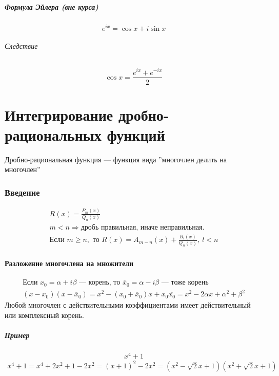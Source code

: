 \documentclass{article}
\begin{document}
\subsubsection{Формула Эйлера (вне курса)}
\[
    e^{ix} = \cos x + i\sin x
\]
\paragraph{Следствие}
\[
    \cos x = \frac{e^{ix} + e^{-ix}}{2}
\]




\newpage
\part{Интегрирование дробно-рациональных функций}
Дробно-рациональная функция --- функция вида ''многочлен делить на многочлен''

\section{Введение}
\begin{gather*}
    R(x) = \frac{P_m(x)}{Q_n(x)} \\
    m < n \Rightarrow \text{дробь правильная, иначе неправильная}. \\
    \text{Если } m \ge n, \text{ то } R(x) = A_{m-n}(x) + \frac{B_l(x)}{Q_n(x)}, ~l < n
\end{gather*}


\subsection{Разложение многочлена на множители}
\begin{gather*}
    \text{Если } x_0 = \alpha + i \beta \text{ --- корень, то } \overline{x}_0 = \alpha - i\beta \text{ --- тоже корень} \\
    (x - x_0)(x - \overline{x}_0) = x^2 - (x_0 + \overline{x}_0)x + x_0\overline{x_0} = x^2 - 2\alpha x + \alpha^2 + \beta^2
\end{gather*}
Любой многочлен с действительными коэффициентами имеет действительный или комплексный корень.

\subsubsection{Пример}
\[
    x^4 + 1
\]
\begin{gather*}
    x^4 + 1 = x^4 + 2x^2 + 1 - 2x^2 = (x + 1)^2 - 2x^2 = (x^2 - \sqrt{2}x + 1)(x^2 + \sqrt{2}x + 1)
\end{gather*}
\end{document}
